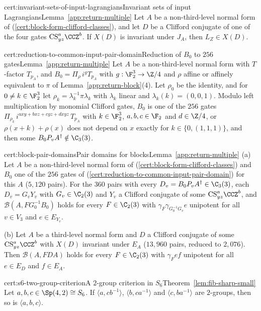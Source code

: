 \begin{finitefact}{cert:invariant-sets-of-input-lagrangians}{Invariant sets of input Lagrangians}{Lemma~\ref{app:return-multiple}}
Let $A$ be a non-third-level normal form of \textup{(\ref{cert:block-form-clifford-classes})}, and let $D$ be a Clifford conjugate of one of the four gates $\mathrm{CS}_{yz}^a\CCZ^b$. If $X(D)$ is invariant under $J_A$, then $L_Z\in X(D)$.
\end{finitefact}

\begin{finitefact}{cert:reduction-to-common-input-pair-domain}{Reduction of $B_0$ to $256$ gates}{Lemma~\ref{app:return-multiple}}
Let $A$ be a non-third-level normal form with $T$-factor $T_{p_A}$, and $B_0=\Pi_\rho\,i^{g}T_{p_A}$ with $g:\F_2^3\to\Z/4$ and $\rho$ affine or affinely equivalent to $\pi$ of Lemma~\ref{app:return-block}\textup{(4)}. Let $\rho_0$ be the identity, and for $0\ne k\in\F_2^3$ let $\rho_k=\lambda_k^{-1}\pi\lambda_k$ with $\lambda_k$ linear and $\lambda_k(k)=(0,0,1)$. Modulo left multiplication by monomial Clifford gates, $B_0$ is one of the $256$ gates $\Pi_{\rho_k}\,i^{axy+bxz+cyz+dxyz}\,T_{p_A}$ with $k\in\F_2^3$, $a,b,c\in\F_2$ and $d\in\Z/4$, or $\rho(x+k)+\rho(x)$ does not depend on $x$ exactly for $k\in\{0,(1,1,1)\}$, and then some $B_0P_vA^\dagger\notin\C_3(3)$.
\end{finitefact}

\begin{finitefact}{cert:block-pair-domains}{Pair domains for blocks}{Lemma~\ref{app:return-multiple}}
(a) Let $A$ be a non-third-level normal form of \textup{(\ref{cert:block-form-clifford-classes})} and $B_0$ one of the $256$ gates of \textup{(\ref{cert:reduction-to-common-input-pair-domain})} for this $A$ ($5{,}120$ pairs). For the $360$ pairs with every $D_v=B_0P_vA^\dagger\in\C_3(3)$, each $D_v=G_vY_v$ with $G_v\in\C_2(3)$ and $Y_v$ a Clifford conjugate of some $\mathrm{CS}_{yz}^a\CCZ^b$, and $\mathcal B(A,FG_0^{-1}B_0)$ holds for every $F\in\C_2(3)$ with $\gamma_F\gamma_{G_0^{-1}G_v}e$ unipotent for all $v\in V_3$ and $e\in E_{Y_v}$.

(b) Let $A$ be a third-level normal form and $D$ a Clifford conjugate of some $\mathrm{CS}_{yz}^a\CCZ^b$ with $X(D)$ invariant under $E_A$ ($13{,}960$ pairs, reduced to $2{,}076$). Then $\mathcal B(A,FDA)$ holds for every $F\in\C_2(3)$ with $\gamma_Fef$ unipotent for all $e\in E_D$ and $f\in E_A$.
\end{finitefact}

\begin{finitefact}{cert:s6-two-group-criterion}{A $2$-group criterion in $S_6$}{Theorem~\ref{lem:fib-sharp-small}}
Let $a,b,c\in\Sp(4,2)\cong S_6$. If $\langle a,cb^{-1}\rangle$, $\langle b,ca^{-1}\rangle$ and $\langle c,ba^{-1}\rangle$ are $2$-groups, then so is $\langle a,b,c\rangle$.
\end{finitefact}

